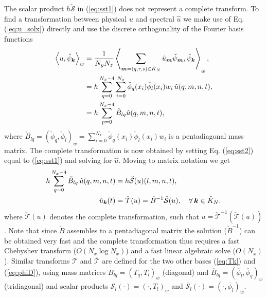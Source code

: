\documentclass[11pt, oneside]{article}
\newcommand{\N}[1]{\check{#1}}
\newcommand{\D}[1]{\overline{#1}}
\begin{document}
The scalar product  $h\N{\mathcal{S}}$ in (\ref{eq:sst1}) does not represent a 
complete transform. To find a transformation between physical $u$ and spectral 
$\hat{u}$ we make use of Eq. (\ref{eq:u_solx}) directly and use the discrete 
orthogonality of the Fourier basis functions
\begin{align}
\left<u, \N{\psi}_{\bm{k}}\right>_w &= \frac{1}{N_yN_z}\left< 
\sum_{\bm{m}=(q,r,s) \in \N{K}_N} \hat{u}_{\bm{m}} \N{\psi}_{\bm{m}}, 
\N{\psi}_{\bm{k}} \right>_w, \notag \\
           &= h \sum_{q=0}^{N_x-4} \sum_{i=0}^{N_x} \N{\phi}_{q}(x_i) 
           \N{\phi}_{l}(x_i) w_i \, \hat{u}(q, {m}, {n}, t), \notag \\
           &= h \sum_{p=0}^{N_x-4} \N{B}_{lq} \hat{u}(q, {m}, {n}, t), 
           \label{eq:sst2}
\end{align}
where $\N{B}_{lq} = (\N{\phi}_q, \N{\phi}_l)_w = 
\sum_{i=0}^{N_x} \N{\phi}_{q}(x_i) \N{\phi}_{l}(x_i) w_i$ is a 
pentadiagonal mass matrix. The complete transformation is now obtained by 
setting Eq. (\ref{eq:sst2}) equal to (\ref{eq:sst1}) and solving for $\hat{u}$. 
Moving to matrix notation we get
\begin{align}
h\sum_{q=0}^{N_x-4} \N{B}_{lq}\, \hat{u}(q, {m}, {n}, t) &= 
h\N{\mathcal{S}}(u)(l, m, n, t), \notag \\
 \hat{u}_{\bm{k}}(t) &= \N{\mathcal{T}}(u) =  \N{B}^{-1}\N{\mathcal{S}}(u), 
 \quad \forall \, \bm{k} \in \N{K}_N. \label{eq:fstB}
\end{align}
where $\N{\mathcal{T}}(u)$ denotes the complete transformation, such that $u = 
\N{\mathcal{T}}^{-1}(\N{\mathcal{T}}(u))$. Note that since $\N{B}$ assembles to 
a pentadiagonal matrix the solution ($\N{B}^{-1}$) can be obtained very fast 
and 
the complete 
transformation thus requires a fast Chebyshev transform ($O(N_x \log N_x)$) and 
a fast linear algebraic solve ($O(N_x)$). Similar transforms $\mathcal{T}$ 
and $\D{\mathcal{T}}$ are defined for the two other bases (\ref{eq:Tk}) and 
(\ref{eq:phiD}), using mass matrices $B_{lq}=(T_q, T_l)_w$ (diagonal) and 
$\D{B}_{lq}=(\D{\phi}_l, \D{\phi}_q)_w$ (tridiagonal) and scalar products 
$\mathcal{S}_l(\cdot) = (\cdot, T_l)_w$ and $\D{\mathcal{S}}_l(\cdot) = (\cdot, 
\D{\phi}_l)_w$.
\end{document}
